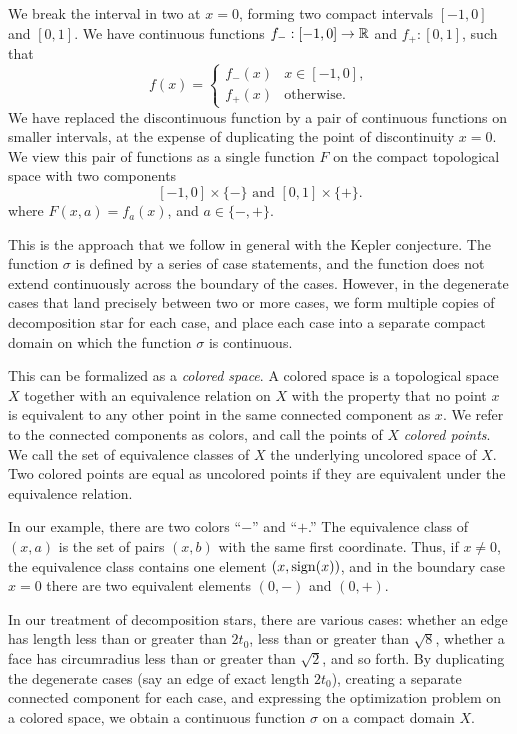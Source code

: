 We break the interval in two at $x=0$, forming two compact
intervals $[-1,0]$ and $[0,1]$.  We have continuous functions
$f_-:[-1,0]\to {\mathbb R}$ and $f_+:[0,1]$, such that
    $$
    f(x)=
    \begin{cases}
        f_-(x) & x\in[-1,0],\\
        f_+(x) & \text{otherwise}.
    \end{cases}
    $$
We have replaced the discontinuous function by a pair of
continuous functions on smaller intervals, at the expense of
duplicating the point of discontinuity $x=0$.  We view this pair
of functions as a single function $F$ on the compact topological
space with two components
    $$[-1,0]\times\{-\} \text{\ and\ } [0,1]\times\{+\}.$$
where $F(x,a) = f_a(x)$, and $a\in\{-,+\}$.

This is the approach that we follow in general with the Kepler
conjecture.  The function $\sigma$ is defined by a series of case
statements, and the function does not extend continuously across the
boundary of the cases.  However, in the degenerate cases that land
precisely between two or more cases, we form multiple copies of
decomposition star for each case, and place each case into a
separate compact domain on which the function $\sigma$ is
continuous.

This can be formalized as a {\it colored space}.  A colored space
is a topological space $X$ together with an equivalence relation
on $X$ with the property that no point $x$ is equivalent to any
other point in the same connected component as $x$.   We refer to
the connected components as colors, and call the points of $X$
{\it colored points}.  We call the set of equivalence classes of
$X$ the underlying uncolored space of $X$. Two colored points are
equal as uncolored points if they are equivalent under the
equivalence relation.

In our example, there are two colors ``$-$'' and ``$+$.''  The
equivalence class of $(x,a)$ is the set of pairs $(x,b)$ with the
same first coordinate.  Thus, if $x\ne0$, the equivalence class
contains one element $(x,\operatorname{sign}(x))$, and in the boundary case
$x=0$ there are two equivalent elements $(0,-)$ and $(0,+)$.

In our treatment of decomposition stars, there are various cases:
whether an edge has length less than or greater than $2t_0$, less
than or greater than $\sqrt8$, whether a face has circumradius
less than or greater than $\sqrt2$, and so forth. By duplicating
the degenerate cases (say an edge of exact length $2t_0$),
creating a separate connected component for each case, and
expressing the optimization problem on a colored space, we obtain
a continuous function $\sigma$ on a compact domain $X$.

